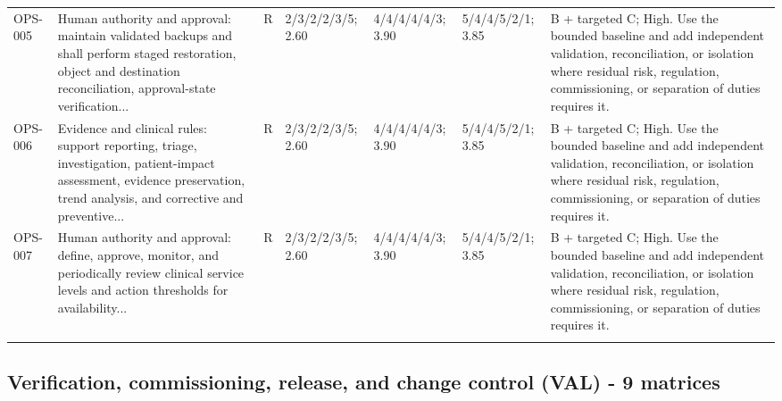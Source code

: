 \documentclass[11pt,letterpaper]{article}
\begin{document}
\begin{scriptsize}
\begin{longtable}{@{}L{0.11\textwidth}L{0.165\textwidth}L{0.04\textwidth}L{0.115\textwidth}L{0.115\textwidth}L{0.115\textwidth}L{0.235\textwidth}@{}}
\addlinespace[2pt]
OPS-005 & Human authority and approval: maintain validated backups and shall perform staged restoration, object and destination reconciliation, approval-state verification... & R & 2/3/2/2/3/5; 2.60 & 4/4/4/4/4/3; 3.90 & 5/4/4/5/2/1; 3.85 & B + targeted C; High. Use the bounded baseline and add independent validation, reconciliation, or isolation where residual risk, regulation, commissioning, or separation of duties requires it. \\
\addlinespace[2pt]
OPS-006 & Evidence and clinical rules: support reporting, triage, investigation, patient-impact assessment, evidence preservation, trend analysis, and corrective and preventive... & R & 2/3/2/2/3/5; 2.60 & 4/4/4/4/4/3; 3.90 & 5/4/4/5/2/1; 3.85 & B + targeted C; High. Use the bounded baseline and add independent validation, reconciliation, or isolation where residual risk, regulation, commissioning, or separation of duties requires it. \\
\addlinespace[2pt]
OPS-007 & Human authority and approval: define, approve, monitor, and periodically review clinical service levels and action thresholds for availability... & R & 2/3/2/2/3/5; 2.60 & 4/4/4/4/4/3; 3.90 & 5/4/4/5/2/1; 3.85 & B + targeted C; High. Use the bounded baseline and add independent validation, reconciliation, or isolation where residual risk, regulation, commissioning, or separation of duties requires it. \\
\addlinespace[2pt]
\end{longtable}
\end{scriptsize}

\subsection{Verification, commissioning, release, and change control (VAL) - 9 matrices}
\end{document}
